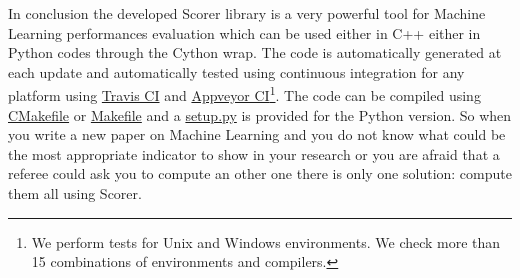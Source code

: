 \documentclass{standalone}
\begin{document}
In conclusion the developed \textsf{Scorer} library is a very powerful tool for Machine Learning performances evaluation which can be used either in \textsf{C++} either in \textsf{Python} codes through the \textsf{Cython} wrap.
The code is automatically generated at each update and automatically tested using continuous integration for any platform using \href{https://github.com/Nico-Curti/scorer/blob/master/.travis.yml}{Travis CI} and \href{https://github.com/Nico-Curti/scorer/blob/master/appveyor.yml}{Appveyor CI}\footnote{
  We perform tests for Unix and Windows environments.
  We check more than 15 combinations of environments and compilers.
}.
The code can be compiled using \href{https://github.com/Nico-Curti/scorer/blob/master/CMakeLists.txt}{\textsf{CMakefile}} or \href{https://github.com/Nico-Curti/scorer/blob/master/Makefile}{\textsf{Makefile}} and a \href{https://github.com/Nico-Curti/scorer/blob/master/setup.py}{\textsf{setup.py}} is provided for the \textsf{Python} version.
So when you write a new paper on Machine Learning and you do not know what could be the most appropriate indicator to show in your research or you are afraid that a referee could ask you to compute an other one there is only one solution: compute them all using \textsf{Scorer}.
\end{document}

